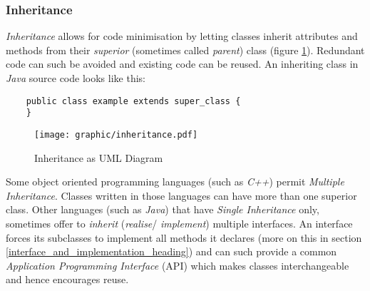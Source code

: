 %
%
%
%
%
%
%

\subsubsection{Inheritance}
\label{inheritance_heading}

\emph{Inheritance} allows for code minimisation by letting classes inherit
attributes and methods from their \emph{superior} (sometimes called \emph{parent})
class (figure \ref{inheritance_figure}). Redundant code can such be avoided and
existing code can be reused. An inheriting class in \emph{Java} source code
looks like this:

\begin{scriptsize}
    \begin{verbatim}
    public class example extends super_class {
    }
    \end{verbatim}
\end{scriptsize}

\begin{figure}[ht]
    \begin{center}
        \texttt{[image: graphic/inheritance.pdf]}
        \caption{Inheritance as UML Diagram}
        \label{inheritance_figure}
    \end{center}
\end{figure}

Some object oriented programming languages (such as \emph{C++}) permit
\emph{Multiple Inheritance}. Classes written in those languages can have more
than one superior class. Other languages (such as \emph{Java}) that have
\emph{Single Inheritance} only, sometimes offer to \emph{inherit}
(\emph{realise}/ \emph{implement}) multiple interfaces. An interface forces its
subclasses to implement all methods it declares (more on this in section
\ref{interface_and_implementation_heading}) and can such provide a common
\emph{Application Programming Interface} (API) which makes classes
interchangeable and hence encourages reuse.
